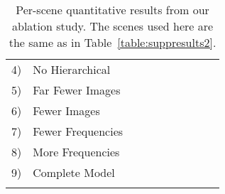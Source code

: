 \documentclass[runningheads]{llncs}
\begin{document}
\begin{table}[t]
{\begin{tabular}{ll|cccccccc}
4) & No Hierarchical           &        &        &        &        &        &        &        &        \\
\arrayrulecolor{gray}
\hline
\arrayrulecolor{black}
5) & Far Fewer Images          &        &        &        &        &        &        &        &        \\
6) & Fewer Images              &        &        &        &        &        &        &        &        \\
\arrayrulecolor{gray}
\hline
\arrayrulecolor{black}
7) & Fewer Frequencies         &        &  &  &        &        &  &        &        \\
8) & More Frequencies          &        &        &        &        &        &        &  &        \\
\arrayrulecolor{gray}
\hline
\arrayrulecolor{black}
9) & Complete Model            &  &        &        &  &  &        &        &  \\
\hline
\multicolumn{9}{c}{}
\end{tabular}
} \vspace{2mm}
 \vspace{2mm}
\caption{Per-scene quantitative results from our ablation study. The scenes used here are the same as in Table~\ref{table:suppresults2}.
}
\label{table:suppresultsabl} 
\end{table}
\setlength{\tabcolsep}{1.4pt} 
\end{document}
